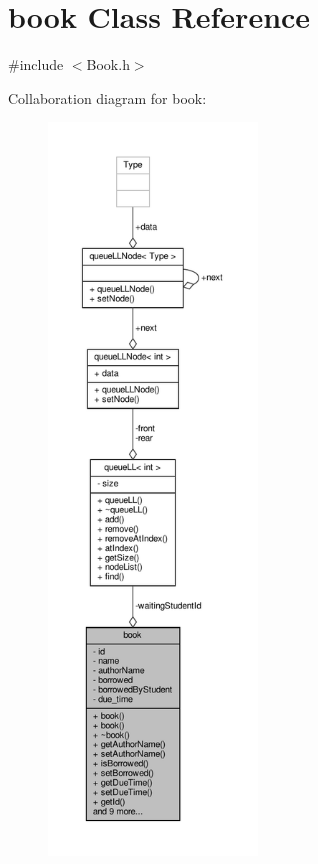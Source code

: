 \hypertarget{classbook}{}\section{book Class Reference}
\label{classbook}


{\ttfamily \#include $<$Book.\+h$>$}



Collaboration diagram for book\+:
\nopagebreak
\begin{figure}[H]
\begin{center}
\leavevmode
\includegraphics[height=550pt]{classbook__coll__graph}
\end{center}
\end{figure}
